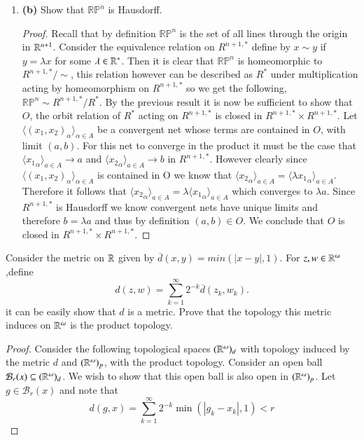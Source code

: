 \documentclass{homework651}
\begin{document}
\begin{problems}
\begin{enumerate}
    \item{\textbf{(b)}} Show that $\mathbb{R}\mathbb{P}^n$ is Hausdorff. 
    \begin{proof} Recall that by definition $\mathbb{R}\mathbb{P}^n$ is the set of all lines through 
        the origin in $\RR^{n+1}$. Consider the equivalence relation on $R^{n+1, *}$ define by $x \sim y$
        if $y = \lambda x$ for some $\lambda \in \RR^*$. Then it is clear that $\mathbb{R}\mathbb{P}^n$
        is homeomorphic to $R^{n+1, *}/\sim$, this relation however can be described as $R^*$ under multiplication 
        acting by homeomorphism on $R^{n+1, *}$ so we get the following, $\mathbb{R}\mathbb{P}^n \sim R^{n+1, *}/R^*$.
        By the previous result it is now be sufficient to show that $O$, the orbit relation of $R^*$ acting on $R^{n+1, *}$ is closed in $R^{n+1, *} \times R^{n+1, *}$.
        Let $\langle (x_1, x_2)_\alpha \rangle_{\alpha \in A}$ be a convergent net whose terms are contained in $O$, with limit $(a, b)$. 
        For this net to converge in the product it must be the case that $\langle {x_1}_\alpha \rangle_{a \in A} \to a$ and $\langle {x_2}_\alpha \rangle_{a \in A} \to b$ in 
       $R^{n+1, *}$. However clearly since $\langle (x_1, x_2)_\alpha \rangle_{\alpha \in A}$ is contained in O we know that $\langle {x_2}_\alpha \rangle_{a \in A} = \langle \lambda{x_1}_\alpha \rangle_{a \in A}$.
       Therefore it follows that $\langle {x_2}_\alpha \rangle_{a \in A} = \lambda\langle {x_1}_\alpha \rangle_{a \in A}$ which converges to $\lambda a$. Since $R^{n+1, *}$
       is Hausdorff we know convergent nets have unique limits and therefore $b = \lambda a$ and thus by definition $(a, b) \in O$. We conclude that $O$ is 
       closed in $R^{n+1, *} \times R^{n+1, *}$.
    \end{proof}
\end{enumerate}



\problem Consider the metric on $\RR$ given by $\overline{d}(x, y) = min(|x - y|, 1)$. For $z, w \in \RR^\omega$,define
\begin{equation*}
    d(z, w) = \sum^{\infty}_{k = 1}2^{-k}\overline{d}(z_k, w_k). 
\end{equation*} 
it can be easily show that $d$ is a metric. Prove that the topology this metric induces on $\RR^{\omega}$
is the product topology. 
\begin{proof} Consider the following topological spaces $(\RR^\omega)_d$ with topology induced by the metric $d$ and $(\RR^{\omega})_p$, 
    with the product topology. Consider an open ball $\mathcal{B}_r(x) \subseteq (\RR^\omega)_d$. We wish to show that this open ball is also 
    open in $(\RR^{\omega})_p$. Let  $g \in \mathcal{B}_r(x)$ and note that $$d(g, x) = \sum_{k = 1}^{\infty}2^{-k} \min(|g_k - x_k|, 1) < r$$


\end{proof}
\end{problems}
\end{document}
